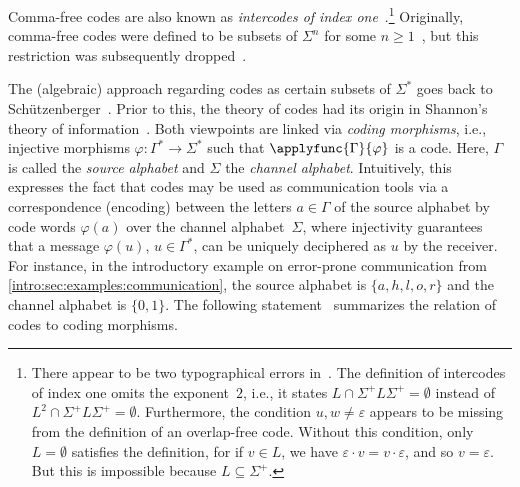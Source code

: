 Comma-free codes are also known as \emph{intercodes of index one}~\cite[Thm.~3]{DBLP:journals/iandc/Jurgensen08}.\footnote{There appear to be two typographical errors in~\cite{DBLP:journals/iandc/Jurgensen08}. The definition of intercodes of index one omits the exponent~$2$, i.e., it states $L \cap \Sigma^+ L \Sigma^+ = \emptyset$ instead of $L^2 \cap \Sigma^+ L \Sigma^+ = \emptyset$. Furthermore, the condition $u,w \ne \varepsilon$ appears to be missing from the definition of an overlap-free code. Without this condition, only $L=\emptyset$ satisfies the definition, for if $v \in L$, we have $\varepsilon \cdot v = v \cdot \varepsilon$, and so $v=\varepsilon$. But this is impossible because $L \subseteq \Sigma^+$.}
Originally, comma-free codes were defined to be subsets of $\Sigma^n$ for some $n \ge 1$~\cite{golomb_gordon_welch_1958}, but this restriction was subsequently dropped~\cite{DBLP:books/daglib/0025093,DBLP:journals/iandc/Jurgensen08,DBLP:journals/tcs/JurgensenS21}.

The (algebraic) approach regarding %
codes as certain subsets of $\Sigma^*$ goes back to Schützenberger~\cite{DBLP:journals/tit/Schutzenberger56}.
Prior to this, the theory of codes had its origin in Shannon's theory of information~\cite{Shannon:1948:MTCa,Shannon:1948:MTCb}.
Both viewpoints are linked via \emph{coding morphisms}, i.e., injective morphisms $\varphi \colon \Gamma^* \to \Sigma^*$
such that $\applyfunc{\Gamma}{\varphi}$ is a code.
Here, $\Gamma$ is called the \emph{source alphabet} 
and $\Sigma$ the \emph{channel alphabet}. 
Intuitively, this  expresses the fact
that codes  may be used as communication tools via a correspondence (encoding)
between the letters  $a \in \Gamma$ of the source alphabet
by code words $\varphi(a)$ over the channel alphabet~$\Sigma$,
where injectivity guarantees that a message $\varphi(u)$, $u \in \Gamma^*$,
can be uniquely deciphered as $u$ by the receiver.
For instance, in the introductory
example on error-prone communication from \cref{intro:sec:examples:communication}, 
the source alphabet is $\{a,h,l,o,r\}$
and the channel alphabet is $\{0,1\}$.
The following statement~\cite[Prop~2.1.1]{DBLP:books/daglib/0025093} summarizes the relation of codes to coding morphisms.

